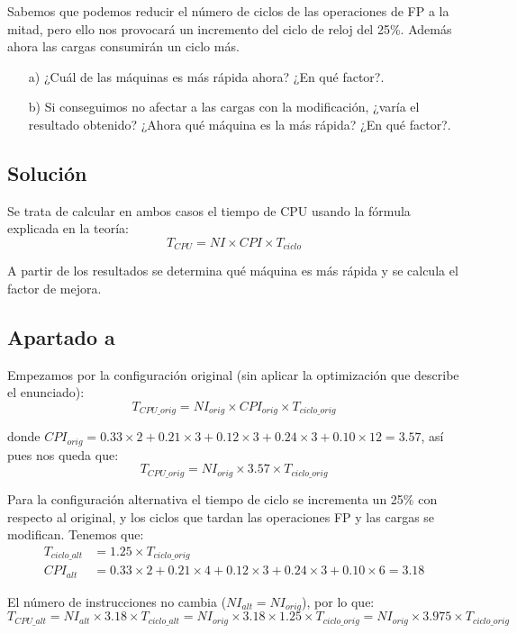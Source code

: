 \documentclass[12pt,onecolumn]{memoir}
\begin{document}
Sabemos que podemos reducir el número de ciclos de las operaciones
de FP a la mitad, pero ello nos provocará un incremento del ciclo
de reloj del 25\%. Además ahora las cargas consumirán un ciclo
más.

\begin{enumerate}

\item[a)] ¿Cuál de las máquinas es más rápida ahora? ¿En qué factor?.
\item[b)] Si conseguimos no afectar a las cargas con la modificación, ¿varía
el resultado obtenido? ¿Ahora qué máquina es la más rápida? ¿En
qué factor?.

\end{enumerate}

\subsection{Solución}

Se trata de calcular en ambos casos el tiempo de CPU usando la fórmula explicada en la teoría:
\[ T_{CPU} = NI \times CPI \times T_{ciclo} \]

A partir de los resultados se determina qué máquina es más rápida y se calcula el factor de mejora.

\subsection*{Apartado a}

Empezamos por la configuración original (sin aplicar la optimización que describe el enunciado):
\[ T_{CPU\_orig} = NI_{orig} \times CPI_{orig} \times T_{ciclo\_orig} \]

donde $CPI_{orig} = 0.33 \times 2 + 0.21 \times 3 + 0.12 \times 3 + 0.24 \times 3 + 0.10 \times 12 = 3.57$, así pues nos queda que:
\[ T_{CPU\_orig} = NI_{orig} \times 3.57 \times T_{ciclo\_orig} \]

Para la configuración alternativa el tiempo de ciclo se incrementa un 25\% con respecto al original, y los ciclos que tardan las operaciones FP y las cargas se modifican. Tenemos que:
\begin{align*}
  T_{ciclo\_alt} &= 1.25 \times T_{ciclo\_orig}\\
  CPI_{alt} &= 0.33 \times 2 + 0.21 \times 4 + 0.12 \times 3 + 0.24 \times 3 + 0.10 \times 6 = 3.18
\end{align*}

El número de instrucciones no cambia ($NI_{alt} = NI_{orig}$), por lo que:
\[ T_{CPU\_alt} = NI_{alt} \times 3.18 \times T_{ciclo\_alt} = NI_{orig} \times 3.18 \times 1.25 \times T_{ciclo\_orig} = NI_{orig} \times 3.975 \times T_{ciclo\_orig} \]
\end{document}
